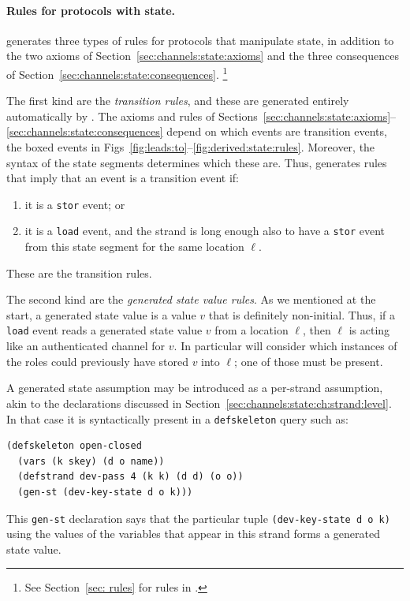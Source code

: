 \paragraph{Rules for protocols with
  state.}  \label{state:gen:rules:start} {\cpsa} generates three types
of rules for protocols that manipulate state, in addition to the two
axioms of Section~\ref{sec:channels:state:axioms} and the three
consequences of Section~\ref{sec:channels:state:consequences}.%
%
\footnote{See Section~\ref{sec: rules} for rules in {\cpsa}.}

The first kind are the \emph{transition rules}, and these are
generated entirely automatically by {\cpsa}.  The axioms and rules of
Sections~\ref{sec:channels:state:axioms}--\ref{sec:channels:state:consequences}
depend on which events are transition events, the boxed events in
Figs~\ref{fig:leads:to}--\ref{fig:derived:state:rules}.  Moreover, the
syntax of the state segments determines which these are.  Thus,
{\cpsa} generates rules that imply that an event is a transition event
if:
%
\begin{enumerate}
  \item it is a \verb|stor| event; or
  \item it is a \verb|load| event, and the strand is long enough also
  to have a \verb|stor| event from this state segment for the same
  location $\ell$.
\end{enumerate}
%
These are the transition rules.

The second kind are the \emph{generated state value rules}.  As we
mentioned at the start, a generated state value is a value $v$ that is
definitely non-initial.  Thus, if a \verb|load| event reads a
generated state value $v$ from a location $\ell$, then $\ell$ is
acting like an authenticated channel for $v$.  In particular {\cpsa}
will consider which instances of the roles could previously have
stored $v$ into $\ell$; one of those must be present.

A generated state assumption may be introduced as a per-strand
assumption, akin to the declarations discussed in
Section~\ref{sec:channels:state:ch:strand:level}.  In that case it is
syntactically present in a {\cpsa} \texttt{defskeleton} query such as:
%
{\small
\begin{verbatim}(defskeleton open-closed
  (vars (k skey) (d o name))
  (defstrand dev-pass 4 (k k) (d d) (o o))
  (gen-st (dev-key-state d o k)))
\end{verbatim}}
%
This \texttt{gen-st} declaration says that the particular tuple
\texttt{(dev-key-state d o k)} using the values of the variables that
appear in this strand forms a generated state value.


